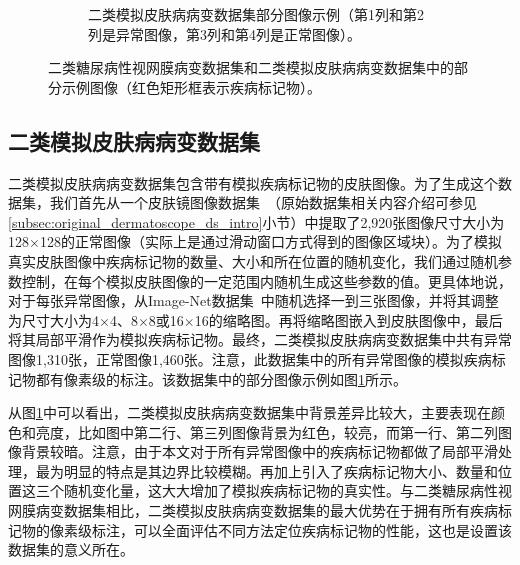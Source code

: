\begin{figure}[h!]
\begin{subfigure}{0.48\textwidth}
		\caption{二类模拟皮肤病病变数据集部分图像示例（第1列和第2列是异常图像，第3列和第4列是正常图像）。}
		\label{subfig:bin_simulate_skin_example}
	\end{subfigure}
	\caption[本章实验数据集部分示例图像]{二类糖尿病性视网膜病变数据集和二类模拟皮肤病病变数据集中的部分示例图像（红色矩形框表示疾病标记物）。}
	\label{mul_fig:bin_ds_example}
\end{figure}
\subsection{二类模拟皮肤病病变数据集}\label{subsec:bin_simulated_skin_ds}
二类模拟皮肤病病变数据集包含带有模拟疾病标记物的皮肤图像。为了生成这个数据集，我们首先从一个皮肤镜图像数据集~\cite{codella2018skin}（原始数据集相关内容介绍可参见\ref{subsec:original_dermatoscope_ds_intro}小节）中提取了2,920张图像尺寸大小为128$\times$128的正常图像（实际上是通过滑动窗口方式得到的图像区域块）。为了模拟真实皮肤图像中疾病标记物的数量、大小和所在位置的随机变化，我们通过随机参数控制，在每个模拟皮肤图像的一定范围内随机生成这些参数的值。更具体地说，对于每张异常图像，从Image-Net数据集~\cite{deng2009imagenet}中随机选择一到三张图像，并将其调整为尺寸大小为4$\times$4、8$\times$8或16$\times$16的缩略图。再将缩略图嵌入到皮肤图像中，最后将其局部平滑作为模拟疾病标记物。最终，二类模拟皮肤病病变数据集中共有异常图像1,310张，正常图像1,460张。注意，此数据集中的所有异常图像的模拟疾病标记物都有像素级的标注。该数据集中的部分图像示例如图\ref{subfig:bin_simulate_skin_example}所示。

从图\ref{subfig:bin_simulate_skin_example}中可以看出，二类模拟皮肤病病变数据集中背景差异比较大，主要表现在颜色和亮度，比如图中第二行、第三列图像背景为红色，较亮，而第一行、第二列图像背景较暗。注意，由于本文对于所有异常图像中的疾病标记物都做了局部平滑处理，最为明显的特点是其边界比较模糊。再加上引入了疾病标记物大小、数量和位置这三个随机变化量，这大大增加了模拟疾病标记物的真实性。与二类糖尿病性视网膜病变数据集相比，二类模拟皮肤病病变数据集的最大优势在于拥有所有疾病标记物的像素级标注，可以全面评估不同方法定位疾病标记物的性能，这也是设置该数据集的意义所在。
